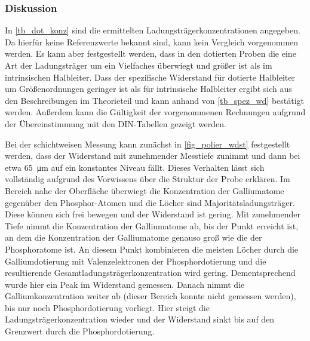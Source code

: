 \documentclass[
	a4paper,
	12pt,
	pagesize,
	ngerman
]{scrartcl}
\begin{document}
	\subsubsection{Diskussion}
	In \cref{tb_dot_konz} sind die ermittelten Ladungsträgerkonzentrationen angegeben.
	Da hierfür keine Referenzwerte bekannt sind, kann kein Vergleich vorgenommen werden.
	Es kann aber festgestellt werden, dass in den dotierten Proben die eine Art der Ladungsträger um ein Vielfaches überwiegt und größer ist als im intrinsischen Halbleiter.
	Dass der spezifische Widerstand für dotierte Halbleiter um Größenordnungen geringer ist als für intrinsische Halbleiter ergibt sich aus den Beschreibungen im Theorieteil und kann anhand von \cref{tb_spez_wd} bestätigt werden.
	Außerdem kann die Gültigkeit der vorgenommenen Rechnungen aufgrund der Übereinstimmung mit den DIN-Tabellen gezeigt werden. %

	Bei der schichtweisen Messung kann zunächst in \cref{fig_polier_wdst} festgestellt werden, dass der Widerstand mit zunehmender Messtiefe zunimmt und dann bei etwa \SI{65}{\micro \meter} auf ein konstantes Niveau fällt.
	Dieses Verhalten lässt sich vollständig aufgrund des Vorwissens über die Struktur der Probe erklären.
	Im Bereich nahe der Oberfläche überwiegt die Konzentration der Galliumatome gegenüber den Phosphor-Atomen und die Löcher sind Majoritätsladungsträger.
	Diese können sich frei bewegen und der Widerstand ist gering.
	Mit zunehmender Tiefe nimmt die Konzentration der Galliumatome ab, bis der Punkt erreicht ist, an dem die Konzentration der Galliumatome genauso groß wie die der Phosphoratome ist.
	An diesem Punkt kombinieren die meisten Löcher durch die Galliumdotierung mit Valenzelektronen der Phosphordotierung und die resultierende Gesamtladungsträgerkonzentration wird gering.
	Dementsprechend wurde hier ein Peak im Widerstand gemessen.
	Danach nimmt die Galliumkonzentration weiter ab (dieser Bereich konnte nicht gemessen werden), bis nur noch Phosphordotierung vorliegt. %
	Hier steigt die Ladungsträgerkonzentration wieder und der Widerstand sinkt bis auf den Grenzwert durch die Phosphordotierung.
\end{document}
